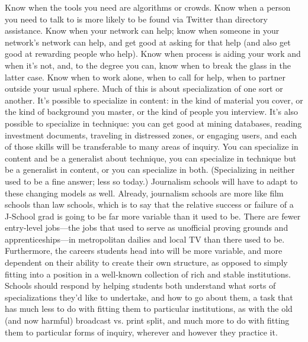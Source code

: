 Know when the tools you need are algorithms or crowds. Know when
a person you need to talk to is more likely to be found via Twitter than
directory assistance. Know when your network can help; know when
someone in your network’s network can help, and get good at asking
for that help (and also get good at rewarding people who help).
Know when process is aiding your work and when it’s not, and, to the
degree you can, know when to break the glass in the latter case. Know
when to work alone, when to call for help, when to partner outside
your usual sphere.
Much of this is about specialization of one sort or another. It’s possible to specialize
in content: in the kind of material you cover, or the kind of background
you master, or the kind of people you interview. It’s also possible to specialize
in technique: you can get good at mining databases, reading investment documents,
traveling in distressed zones, or engaging users, and each of those skills will
be transferable to many areas of inquiry. You can specialize in content and be a
generalist about technique, you can specialize in technique but be a generalist in
content, or you can specialize in both. (Specializing in neither used to be a fine
answer; less so today.)
Journalism schools will have to adapt to these changing models as well. Already,
journalism schools are more like film schools than law schools, which is to say
that the relative success or failure of a J-School grad is going to be far more variable
than it used to be. There are fewer entry-level jobs—the jobs that used to
serve as unofficial proving grounds and apprenticeships—in metropolitan dailies
and local TV than there used to be. Furthermore, the careers students head into
will be more variable, and more dependent on their ability to create their own
structure, as opposed to simply fitting into a position in a well-known collection
of rich and stable institutions.
Schools should respond by helping students both understand what sorts of specializations
they’d like to undertake, and how to go about them, a task that has
much less to do with fitting them to particular institutions, as with the old (and
now harmful) broadcast vs. print split, and much more to do with fitting them to
particular forms of inquiry, wherever and however they practice it.

